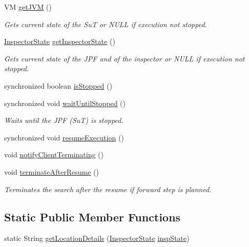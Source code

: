 \begin{DoxyCompactItemize}
\item 
VM \hyperlink{classgov_1_1nasa_1_1jpf_1_1inspector_1_1server_1_1jpf_1_1_stop_holder_a61538f1b06885ad49eabf9d5fd10e254}{get\+J\+VM} ()
\begin{DoxyCompactList}\small\item\em Gets current state of the SuT or N\+U\+LL if execution not stopped. \end{DoxyCompactList}\item 
\hyperlink{interfacegov_1_1nasa_1_1jpf_1_1inspector_1_1server_1_1expression_1_1_inspector_state}{Inspector\+State} \hyperlink{classgov_1_1nasa_1_1jpf_1_1inspector_1_1server_1_1jpf_1_1_stop_holder_a1bad9bde4a6af463706584a73c3dd5e2}{get\+Inspector\+State} ()
\begin{DoxyCompactList}\small\item\em Gets current state of the J\+PF and of the inspector or N\+U\+LL if execution not stopped. \end{DoxyCompactList}\item 
synchronized boolean \hyperlink{classgov_1_1nasa_1_1jpf_1_1inspector_1_1server_1_1jpf_1_1_stop_holder_a9ce9430793863b6d314d8e44c8112081}{is\+Stopped} ()
\item 
synchronized void \hyperlink{classgov_1_1nasa_1_1jpf_1_1inspector_1_1server_1_1jpf_1_1_stop_holder_aa4e7899c51ecb3834e202f861af6e752}{wait\+Until\+Stopped} ()
\begin{DoxyCompactList}\small\item\em Waits until the J\+PF (SuT) is stopped. \end{DoxyCompactList}\item 
synchronized void \hyperlink{classgov_1_1nasa_1_1jpf_1_1inspector_1_1server_1_1jpf_1_1_stop_holder_a2c9b742cc32a8f8b150df3a920250f29}{resume\+Execution} ()
\item 
void \hyperlink{classgov_1_1nasa_1_1jpf_1_1inspector_1_1server_1_1jpf_1_1_stop_holder_a3bbe9e2d1cd3f75c86c107708a770a55}{notify\+Client\+Terminating} ()
\item 
void \hyperlink{classgov_1_1nasa_1_1jpf_1_1inspector_1_1server_1_1jpf_1_1_stop_holder_a4b0dc5f3af8b6a397e93937cf733e76b}{terminate\+After\+Resume} ()
\begin{DoxyCompactList}\small\item\em Terminates the search after the resume if forward step is planned. \end{DoxyCompactList}\end{DoxyCompactItemize}
\subsection*{Static Public Member Functions}
\begin{DoxyCompactItemize}
\item 
static String \hyperlink{classgov_1_1nasa_1_1jpf_1_1inspector_1_1server_1_1jpf_1_1_stop_holder_a7303f3c9c559d73682ec1dd9d64ecc72}{get\+Location\+Details} (\hyperlink{interfacegov_1_1nasa_1_1jpf_1_1inspector_1_1server_1_1expression_1_1_inspector_state}{Inspector\+State} \hyperlink{classgov_1_1nasa_1_1jpf_1_1inspector_1_1server_1_1jpf_1_1_stop_holder_a9fe94c33b32604112b8cf9bc0a72f401}{insp\+State})
\end{DoxyCompactItemize}
